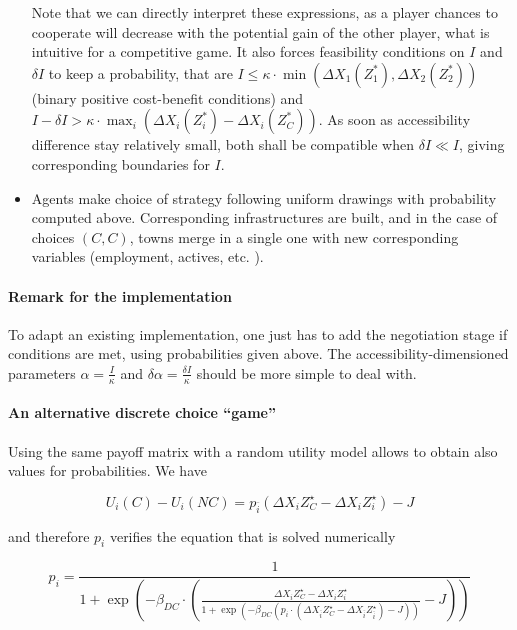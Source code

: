 \begin{itemize}
Note that we can directly interpret these expressions, as a player chances to cooperate will decrease with the potential gain of the other player, what is intuitive for a competitive game. It also forces feasibility conditions on $I$ and $\delta I$ to keep a probability, that are $I \leq \kappa\cdot \min(\Delta X_1(Z^{\ast}_1),\Delta X_2(Z^{\ast}_2))$ (binary positive cost-benefit conditions) and $I-\delta I > \kappa \cdot \max_i (\Delta X_i(Z^{\ast}_i)-\Delta X_i(Z^{\ast}_C))$. As soon as accessibility difference stay relatively small, both shall be compatible when $\delta I \ll I$, giving corresponding boundaries for $I$.

\item Agents make choice of strategy following uniform drawings with probability computed above. Corresponding infrastructures are built, and in the case of choices $(C,C)$, towns merge in a single one with new corresponding variables (employment, actives, etc. ).


\end{itemize}



\paragraph{Remark for the implementation}

To adapt an existing implementation, one just has to add the negotiation stage if conditions are met, using probabilities given above. The accessibility-dimensioned parameters $\alpha = \frac{I}{\kappa}$ and $\delta \alpha = \frac{\delta I}{\kappa}$ should be more simple to deal with.


\paragraph{An alternative discrete choice ``game''}

Using the same payoff matrix with a random utility model allows to obtain also values for probabilities. We have

\[
U_i(C) - U_i(NC) = p_{\bar{i}} \left( \Delta X_{i}{Z^{\star}_{C}} - \Delta X_{i}{Z^{\star}_{i}}\right) - J
\]

and therefore $p_i$ verifies the equation that is solved numerically

\[
p_i = \frac{1}{1 + \exp{\left(-\beta_{DC}\cdot \left(\frac{\Delta X_{i}{Z^{\star}_{C}} - \Delta X_{i}{Z^{\star}_{i}}}{1 + \exp{\left(- \beta_{DC}(p_i \cdot (\Delta X_{\bar{i}}{Z^{\star}_{C}} - \Delta X_{\bar{i}}{Z^{\star}_{\bar{i}}}) - J)\right)}} - J \right)\right)}}
\]


